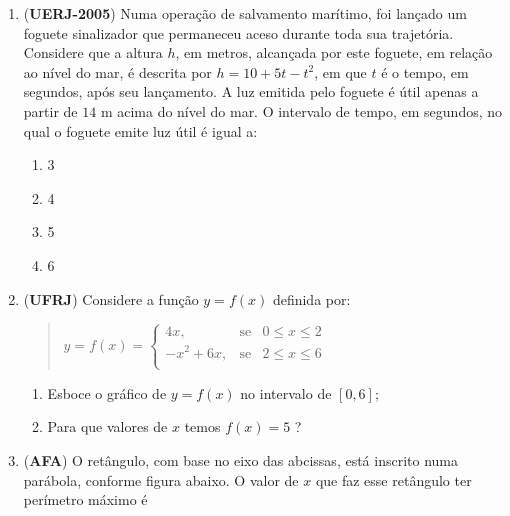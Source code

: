 {\begin{enumerate}
\(x\) representa a quantidade de unidades produzidas e \(y\) o custo total, em reais, para produzir essas quantidades.
Considere que o preço de venda das \(x\) unidades produzidas seja \(220 – x\); Lembre-se que o lucro é a diferença entre o que se arrecada e o gasto que se tem. Nessas condições, qual deve ser a quantidade \(x\) produzida para se obter o lucro máximo?

\item (\textbf{UERJ-2005}) Numa operação de salvamento marítimo, foi lançado um foguete sinalizador que permaneceu aceso durante toda sua trajetória. Considere que a altura \(h\), em metros, alcançada por este foguete, em relação ao nível do mar, é descrita por \(h = 10 + 5t - t^2\), em que \(t\) é o tempo, em segundos, após seu lançamento. A luz emitida pelo foguete é útil apenas a partir de \(14\) m acima do nível do mar. O intervalo de tempo, em segundos, no qual o foguete emite luz útil é igual a:
\begin{enumerate}
\item 3
\item 4
\item 5
\item 6
\end{enumerate}

\item (\textbf{UFRJ}) Considere a função \(y = f(x)\) definida por:
\begin{quote}

\(y = f(x) = \left\{ \begin{array}{rlll} 4x, & \text{se} & 0 \leq x \leq 2 \\ -x^2+6x, & \text{se} & 2 \leq x \leq 6 \\ \end{array} \right.\)
\end{quote}
\begin{enumerate}
\item {} 
Esboce o gráfico de \(y = f(x)\) no intervalo de \([0,6]\);

\item {} 
Para que valores de \(x\) temos \(f(x) = 5\) ?

\end{enumerate}

\clearpage
\item (\textbf{AFA}) O retângulo, com base no eixo das abcissas, está inscrito numa parábola, conforme figura abaixo. O valor de  \(x\)  que faz esse retângulo ter perímetro máximo é
\begin{figure}[H]
\centering


\end{figure}
\end{enumerate}}
